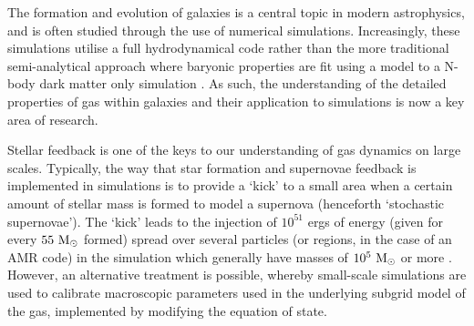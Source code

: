 The formation and evolution of galaxies is a central topic in modern astrophysics, and is often studied through the use of numerical simulations.
Increasingly, these simulations utilise a full hydrodynamical code \citep{vogelsberger_introducing_2014,schaye_eagle_2015} rather than the more traditional semi-analytical approach where baryonic properties are fit using a model to a N-body dark matter only simulation \citep{baugh_primer_2006, bower_breaking_2006}.
As such, the understanding of the detailed properties of gas within galaxies and their application to simulations is now a key area of research.

Stellar feedback is one of the keys to our understanding of gas dynamics on large scales.
Typically, the way that star formation and supernovae feedback is implemented in simulations is to provide a `kick' to a small area when a certain amount of stellar mass is formed to model a supernova (henceforth `stochastic supernovae').
The `kick' leads to the injection of $10^{51}$ ergs of energy (given for every $55 ~\mathrm{M}_{\odot}$ formed) spread over several particles (or regions, in the case of an AMR code) in the simulation which generally have masses of $10^5 ~\mathrm{M}_{\odot}$ or more \citep{tasker_simulating_2006, joung_dependence_2009, hummels_adaptive_2012, hopkins_meaning_2013, becerra_interstellar_2014}.
However, an alternative treatment is possible, whereby small-scale simulations are used to calibrate macroscopic parameters used in the underlying subgrid model of the gas, implemented by modifying the equation of state.
